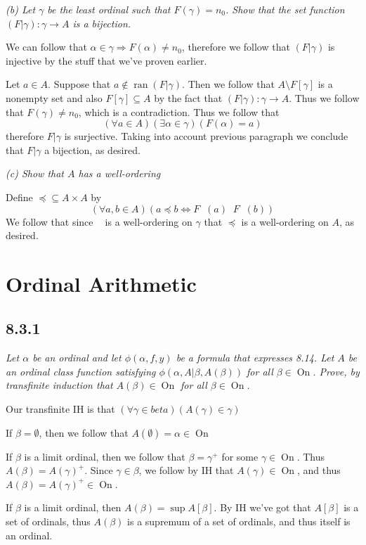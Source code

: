\documentclass[11pt,oneside,titlepage]{book}
\DeclareMathOperator \inv {^{-1}}
\DeclareMathOperator \lra {\Leftrightarrow}
\DeclareMathOperator \ra {\Rightarrow}
\DeclareMathOperator \ran {ran}
\DeclareMathOperator \On {On}
\DeclareMathOperator \ineq {\underline{\in}}
\begin{document}
\textit{(b) Let $\gamma$ be the least ordinal such that $F(\gamma) = n_0$. Show that the set
function $(F|\gamma): \gamma \to A$ is a bijection.}

We can follow that $\alpha \in \gamma \ra F(\alpha) \neq n_0$, therefore we follow that
$(F|\gamma)$ is injective by the stuff that we've proven earlier.

Let $a \in A$. Suppose that $a \notin \ran(F|\gamma)$. Then we follow that
$A \setminus F[\gamma]$ is a nonempty set and also $F[\gamma] \subseteq A$ by the
fact that $(F|\gamma): \gamma \to A$. Thus we follow that $F(\gamma) \neq n_0$,
which is a contradiction. Thus we follow that
$$(\forall a \in A)(\exists \alpha \in \gamma)(F(\alpha) = a)$$
therefore $F|\gamma$ is surjective. 
Taking into account previous paragraph we conclude that $F|\gamma$ a bijection, as desired.

\textit{(c) Show that $A$ has a well-ordering}

Define $\preceq \subseteq A \times A$  by
$$(\forall a, b \in A)(a \preceq b \lra F\inv(a) \ineq F\inv(b))$$
We follow that since $\ineq$ is a well-ordering on $\gamma$ that $\preceq$ is a well-ordering
on $A$, as desired.

\section{Ordinal Arithmetic}

\subsection*{8.3.1}

\textit{Let $\alpha$ be an ordinal and let $\phi(\alpha, f, y)$ be a formula that expresses
  8.14. Let $A$ be an ordinal class function satisfying $\phi(\alpha, A|\beta, A(\beta))$
  for all $\beta \in \On$. Prove, by transfinite induction that $A(\beta) \in \On$ for
  all $\beta \in \On$.}

Our transfinite IH is that
$(\forall \gamma \in beta)(A(\gamma) \in \gamma)$

If $\beta = \emptyset$, then we follow that $A(\emptyset) = \alpha \in \On$

If $\beta$ is a limit ordinal, then we follow that $\beta = \gamma^+$ for some
$\gamma \in \On$. Thus $A(\beta) = A(\gamma)^+$. Since $\gamma \in \beta$, we follow
by IH that $A(\gamma) \in \On$, and thus $A(\beta) = A(\gamma)^+ \in \On$.

If $\beta$ is a limit ordinal, then $A(\beta) = \sup A[\beta]$.  By IH we've
got that $A[\beta]$ is a set of ordinals, thus $A(\beta)$ is a supremum of a set of
ordinals, and thus itself is an ordinal.
\end{document}
